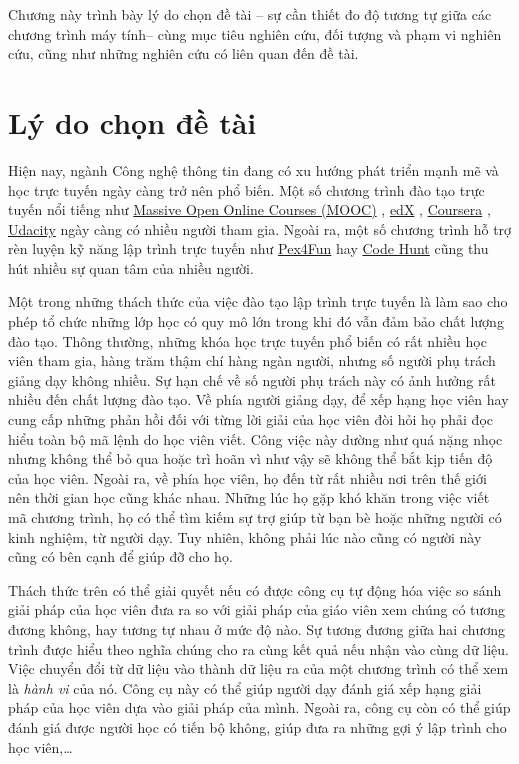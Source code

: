 Chương này trình bày lý do chọn đề tài -- sự cần thiết đo độ tương tự
giữa các chương trình máy tính-- cùng mục tiêu nghiên cứu, đối tượng và phạm
vi nghiên cứu, cũng như những nghiên cứu có liên quan đến đề tài.

\section{Lý do chọn đề tài}

Hiện nay, ngành Công nghệ thông tin đang có xu hướng phát triển mạnh
mẽ và học trực tuyến ngày càng trở nên phổ biến. Một số chương trình
đào tạo trực tuyến nổi tiếng như
\href{https://www.coursera.org/course/saas}{Massive Open Online
  Courses (MOOC)} \cite{mooc}, \href{https://www.edx.org/}{edX}
\cite{edx}, \href{https://www.coursera.org/}{Coursera}
\cite{coursera}, \href{http://www.udacity.com/}{Udacity}
\cite{Udacity} ngày càng có nhiều người tham gia. Ngoài ra, một số
chương trình hỗ trợ rèn luyện kỹ năng lập trình trực tuyến như
\href{https://www.pexforfun.com/}{Pex4Fun} \cite{Pex4Fun} hay
\href{https://www.microsoft.com/en-us/research/project/code-hunt/}{Code
  Hunt} \cite{CodeHunt} cũng thu hút nhiều sự quan tâm của nhiều
người. 

Một trong những thách thức của việc đào tạo lập trình trực tuyến là
làm sao cho phép tổ chức những lớp học có quy mô lớn trong khi đó vẫn
đảm bảo chất lượng đào tạo. Thông thường, những khóa học trực tuyến
phổ biến có rất nhiều học viên tham gia, hàng trăm thậm chí hàng ngàn
người, nhưng số người phụ trách giảng dạy không nhiều. Sự hạn chế về
số người phụ trách này có ảnh hưởng rất nhiều đến chất lượng đào
tạo. Về phía người giảng dạy, để xếp hạng học viên hay cung cấp những
phản hồi đối với từng lời giải của học viên đòi hỏi họ phải đọc hiểu
toàn bộ mã lệnh do học viên viết. Công việc này dường như quá nặng
nhọc nhưng không thể bỏ qua hoặc trì hoãn vì như vậy sẽ không thể bắt
kịp tiến độ của học viên. Ngoài ra, về phía học viên, họ đến từ rất
nhiều nơi trên thế giới nên thời gian học cũng khác nhau. Những lúc họ
gặp khó khăn trong việc viết mã chương trình, họ có thể tìm kiếm sự
trợ giúp từ bạn bè hoặc những người có kinh nghiệm, từ người dạy. Tuy
nhiên, không phải lúc nào cũng có người này cũng có bên cạnh để giúp
đỡ cho họ.

Thách thức trên có thể giải quyết nếu có được công cụ tự động hóa việc
so sánh giải pháp của học viên đưa ra so với giải pháp của giáo viên
xem chúng có tương đương không, hay tương tự nhau ở mức độ nào. Sự
tương đương giữa hai chương trình được hiểu theo nghĩa chúng cho ra
cùng kết quả nếu nhận vào cùng dữ liệu. Việc chuyển đổi từ dữ liệu vào
thành dữ liệu ra của một chương trình có thể xem là \emph{hành vi} của
nó. Công cụ này có thể giúp người dạy đánh giá xếp hạng giải pháp của
học viên dựa vào giải pháp của mình. Ngoài ra, công cụ còn có thể giúp
đánh giá được người học có tiến bộ không, giúp đưa ra những gợi ý lập
trình cho học viên,\dots

